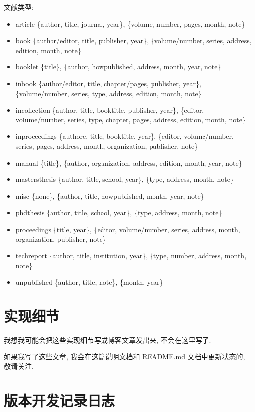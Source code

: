 \documentclass{cugrep}
\begin{document}
文献类型:
\begin{itemize}
    \item article\quad{} \{author, title, journal, year\}, \{volume, number, pages, month, note\}
    \item book\quad{} \{author/editor, title, publisher, year\}, \{volume/number, series, address, edition, month, note\}
    \item booklet\quad{} \{title\}, \{author, howpublished, address, month, year, note\}
    \item inbook\quad{} \{author/editor, title, chapter/pages, publisher, year\}, \{volume/number, series, type, address, edition, month, note\}
    \item incollection\quad{} \{author, title, booktitle, publisher, year\}, \{editor, volume/number, series, type, chapter, pages, address, edition, month, note\}
    \item inproceedings\quad{} \{authore, title, booktitle, year\}, \{editor, volume/number, series, pages, address, month, organization, publisher, note\}
    \item manual\quad{} \{title\}, \{author, organization, address, edition, month, year, note\}
    \item mastersthesis\quad{} \{author, title, school, year\}, \{type, address, month, note\}
    \item misc\quad{} \{none\}, \{author, title, howpublished, month, year, note\}
    \item phdthesis\quad{} \{author, title, school, year\}, \{type, address, month, note\}
    \item proceedings\quad{} \{title, year\}, \{editor, volume/number, series, address, month, organization, publisher, note\}
    \item techreport\quad{} \{author, title, institution, year\}, \{type, number, address, month, note\}
    \item unpublished\quad{} \{author, title, note\}, \{month, year\}
\end{itemize}
\chapter{实现细节}

我想我可能会把这些实现细节写成博客文章发出来, 不会在这里写了.

如果我写了这些文章, 我会在这篇说明文档和 README.md 文档中更新状态的, 敬请关注.
\chapter{版本开发记录日志}
\end{document}
